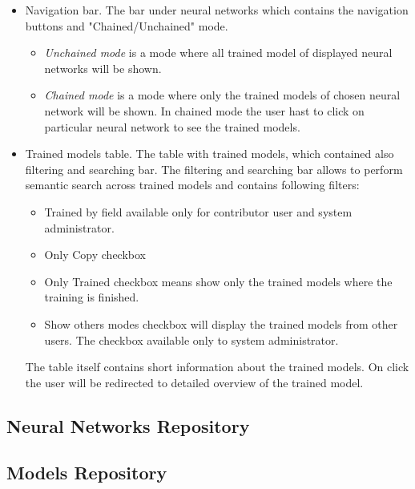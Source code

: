 \begin{itemize}
\item{Navigation bar.} The bar under neural networks which contains the navigation buttons and "Chained/Unchained" mode.
\begin{itemize}
\item \emph{Unchained mode} is a mode where all trained model of displayed neural networks will be shown.
\item \emph{Chained mode} is a mode where only the trained models of chosen neural network will be shown. In chained mode the user hast to click on particular neural network to see the trained models. 
\end{itemize}

\item{Trained models table.} The table with trained models, which contained also filtering and searching bar.
The filtering and searching bar allows to perform semantic search across trained models and contains following filters:
\begin{itemize}
\item Trained by field available only for contributor user and system administrator.
\item Only Copy checkbox
\item Only Trained checkbox means show only the trained models where the training is finished.
\item Show others modes checkbox will display the trained models from other users. The checkbox available only to system administrator.
\end{itemize}

The table itself contains short information about the trained models. On click the user will be redirected to detailed overview of the trained model.


\end{itemize}



\subsection{Neural Networks Repository}\label{Neural Networks Repository}
\subsection{Models Repository}\label{Models Repository}
